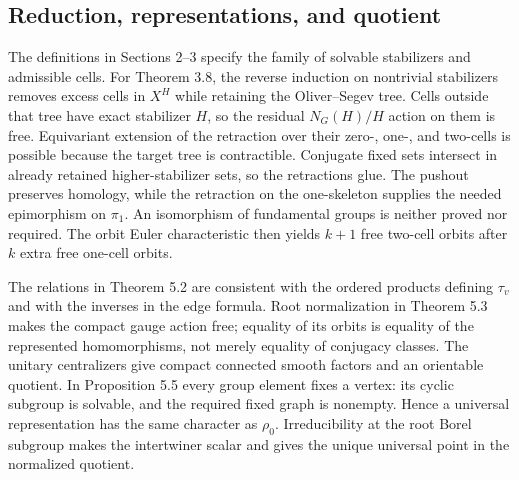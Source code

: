 \documentclass[10pt]{article}
\begin{document}
\subsection*{Reduction, representations, and quotient}
The definitions in Sections 2–3 specify the family of solvable stabilizers and admissible cells. For Theorem 3.8, the reverse induction on nontrivial stabilizers removes excess cells in \(X^H\) while retaining the Oliver–Segev tree. Cells outside that tree have exact stabilizer \(H\), so the residual \(N_G(H)/H\) action on them is free. Equivariant extension of the retraction over their zero-, one-, and two-cells is possible because the target tree is contractible. Conjugate fixed sets intersect in already retained higher-stabilizer sets, so the retractions glue. The pushout preserves homology, while the retraction on the one-skeleton supplies the needed epimorphism on \(\pi_1\). An isomorphism of fundamental groups is neither proved nor required. The orbit Euler characteristic then yields \(k+1\) free two-cell orbits after \(k\) extra free one-cell orbits.\par
The relations in Theorem 5.2 are consistent with the ordered products defining \(\tau_v\) and with the inverses in the edge formula. Root normalization in Theorem 5.3 makes the compact gauge action free; equality of its orbits is equality of the represented homomorphisms, not merely equality of conjugacy classes. The unitary centralizers give compact connected smooth factors and an orientable quotient. In Proposition 5.5 every group element fixes a vertex: its cyclic subgroup is solvable, and the required fixed graph is nonempty. Hence a universal representation has the same character as \(\rho_0\). Irreducibility at the root Borel subgroup makes the intertwiner scalar and gives the unique universal point in the normalized quotient.\par
\end{document}
